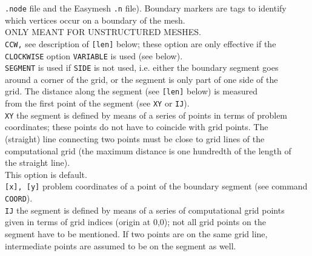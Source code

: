 \documentclass[12pt]{book}
\begin{document}
\begin{tabbing}
                        {\tt .node} file and the Easymesh {\tt .n} file). Boundary markers are tags to identify\\
                        which vertices occur on a boundary of the mesh.\\
                        ONLY MEANT FOR UNSTRUCTURED MESHES.\-\\
{\tt CCW,}           \> see description of {\tt [len]} below; these option are only effective if the\\
{\tt CLOCKWISE}      \> option {\tt VARIABLE} is used (see below).\\
{\tt SEGMENT}        \> is used if {\tt SIDE} is not used, i.e. either the boundary segment goes\+\\
                        around a corner of the grid, or the segment is only part of one side of the\\
                        grid. The distance along the segment (see {\tt [len]} below) is measured\\
                        from the first point of the segment (see {\tt XY} or {\tt IJ}).\-\\
{\tt XY}             \> the segment is defined by means of a series of points in terms of problem\+\\
                        coordinates; these points do not have to coincide with grid points. The\\
                        (straight) line connecting two points must be close to grid lines of the\\
                        computational grid (the maximum distance is one hundredth of the length of\\
                        the straight line).\\
                        This option is default.\-\\
{\tt [x], [y]}       \> problem coordinates of a point of the boundary segment (see command {\tt COORD}).\\
{\tt IJ}             \> the segment is defined by means of a series of computational grid points\+\\
                        given in terms of grid indices (origin at 0,0); not all grid points on the\\
                        segment have to be mentioned. If two points are on the same grid line,\\
                        intermediate points are assumed to be on the segment as well.\-\\

\end{tabbing}
\end{document}
